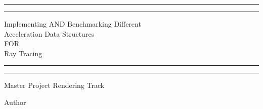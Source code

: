\documentclass[11pt,a4paper]{article}
\begin{document}
  

\begin{titlepage} %

	\centering %
	
	\scshape %
	
	\vspace*{\baselineskip} %
	
	
	
	\rule{\textwidth}{1.6pt}\vspace*{-\baselineskip}\vspace*{2pt} %
	\rule{\textwidth}{0.4pt} %
	
	\vspace{0.75\baselineskip} %
	
	{\LARGE Implementing AND Benchmarking Different \\ Acceleration Data Structures \\ FOR \\Ray Tracing  \\} %
	
	\vspace{0.75\baselineskip} %
	
	\rule{\textwidth}{0.4pt}\vspace*{-\baselineskip}\vspace{3.2pt} %
	\rule{\textwidth}{1.6pt} %
	
	\vspace{2\baselineskip} %
	
	
	Master Project Rendering Track %
	
	\vspace*{3\baselineskip} %
	
	
	Author
	
	\vspace{0.5\baselineskip} %
	

\end{titlepage}
\end{document}
